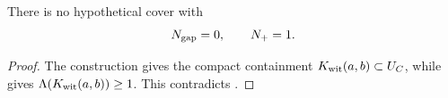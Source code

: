 \begin{theorem}
\label{thm:reader-zero-gap-obstruction}
There is no hypothetical cover with
\[
 N_{\rm gap}=0,
 \qquad
 N_+=1.
\]
\end{theorem}

\begin{proof}
The construction gives the compact containment
\(K_{\rm wit}(a,b)\subset U_C\), while
 gives
\(\Lambda(K_{\rm wit}(a,b))\ge1\).  This contradicts
.
\end{proof}
